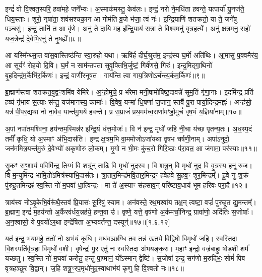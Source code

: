 इन्द्रं॑ वो वि॒श्वत॒स्परि॒ हवा॑महे॒ जने᳚भ्यः। अ॒स्माक॑मस्तु॒ केव॑लः। इन्द्रं॒ नरो॑ ने॒मधि॑ता हवन्ते॒ यत्पार्या॑ यु॒नज॑ते॒ धिय॒स्ताः। शूरो॒ नृषा॑ता॒ शव॑सश्चका॒न आ गोम॑ति व्र॒जे भ॑जा॒ त्वं नः॑। इ॒न्द्रि॒याणि॑ शतक्रतो॒ या ते॒ जने॑षु प॒ञ्चसु॑। इन्द्र॒ तानि॑ त॒ आ वृ॑णे। अनु॑ ते दायि म॒ह इ॑न्द्रि॒याय॑ स॒त्रा ते॒ विश्व॒मनु॑ वृत्र॒हत्ये᳚। अनु॑ क्ष॒त्रमनु॒ सहो॑ यज॒त्रेन्द्र॑ दे॒वेभि॒रनु॑ ते नृ॒षह्ये᳚॥८॥

आ यस्मि᳚न्थ्स॒प्त वा॑स॒वास्तिष्ठ॑न्ति स्वा॒रुहो॑ यथा। ऋषि॑र्\mbox{}ह दीर्घ॒श्रुत्त॑म॒ इन्द्र॑स्य घ॒र्मो अति॑थिः। आ॒मासु॑ प॒क्वमैर॑य॒ आ सूर्यꣳ॑ रोहयो दि॒वि। घ॒र्मं न साम॑न्तपता सुवृ॒क्तिभि॒र्जुष्टं॒ गिर्व॑णसे॒ गिरः॑। इन्द्र॒मिद्गा॒थिनो॑ बृ॒हदिन्द्र॑म॒र्केभि॑र॒र्किणः॑। इन्द्रं॒ वाणी॑रनूषत। गाय॑न्ति त्वा गाय॒त्रिणोऽर्च॑न्त्य॒र्कम॒र्किणः॑॥९॥

 ब्र॒ह्माण॑स्त्वा शतक्रत॒वुद्व॒ꣳ॒शमि॑व येमिरे। अ॒ꣳ॒हो॒मुचे॒ प्र भ॑रेमा मनी॒षामो॑षिष्ठ॒दावन्ने॑ सुम॒तिं गृ॑णा॒नाः। इ॒दमि॑न्द्र॒ प्रति॑ ह॒व्यं गृ॑भाय स॒त्याः स॑न्तु॒ यज॑मानस्य॒ कामाः᳚। वि॒वेष॒ यन्मा॑ धि॒षणा॑ ज॒जान॒ स्तवै॑ पु॒रा पार्या॒दिन्द्र॒मह्नः॑। अꣳह॑सो॒ यत्र॑ पी॒पर॒द्यथा॑ नो ना॒वेव॒ यान्त॑मु॒भये॑ हवन्ते। प्र स॒म्राजं॑ प्रथ॒मम॑ध्व॒राणा॑मꣳहो॒मुचं॑ वृष॒भं य॒ज्ञिया॑नाम्॥१०॥
 
अ॒पां नपा॑तमश्विना॒ हय॑न्तम॒स्मिन्न॑र इन्द्रि॒यं ध॑त्त॒मोजः॑। वि न॑ इन्द्र॒ मृधो॑ जहि नी॒चा य॑च्छ पृतन्य॒तः। अ॒ध॒स्प॒दं तमीं᳚ कृधि॒ यो अ॒स्माꣳ अ॑भि॒दास॑ति। इन्द्र॑ क्ष॒त्रम॒भि वा॒ममोजोऽजा॑यथा वृषभ चर्\mbox{}षणी॒नाम्। अपा॑ऽनुदो॒ जन॑ममित्र॒यन्त॑मु॒रुं दे॒वेभ्यो॑ अकृणोरु लो॒कम्। मृ॒गो न भी॒मः कु॑च॒रो गि॑रि॒ष्ठाः प॑रा॒वत॒ आ ज॑गामा॒ पर॑स्याः॥११॥
 
   सृ॒कꣳ स॒ꣳ॒शाय॑ प॒विमि॑न्द्र ति॒ग्मं वि शत्रू᳚न् ताढि॒ वि मृधो॑ नुदस्व। वि शत्रू॒न्॒ वि मृधो॑ नुद॒ वि वृ॒त्रस्य॒ हनू॑ रुज। वि म॒न्युमि॑न्द्र भामि॒तो॑ऽमित्र॑स्याभि॒दास॑तः। त्रा॒तार॒मिन्द्र॑मवि॒तार॒मिन्द्र॒ꣳ॒ हवे॑हवे सु॒हव॒ꣳ॒ शूर॒मिन्द्रम्᳚। हु॒वे नु श॒क्रं पु॑रुहू॒तमिन्द्रꣴ॑ स्व॒स्ति नो॑ म॒घवा॑ धा॒त्विन्द्रः॑। मा ते॑ अ॒स्याꣳ स॑हसाव॒न् परि॑ष्टाव॒धाय॑ भूम हरिवः परा॒दै॥१२॥ 
   
   त्राय॑स्व नोऽवृ॒केभि॒र्वरू॑थै॒स्तव॑ प्रि॒यासः॑ सू॒रिषु॑ स्याम। अन॑वस्ते॒ रथ॒मश्वा॑य तक्ष॒न् त्वष्टा॒ वज्रं॑ पुरुहूत द्यु॒मन्तम्᳚। ब्र॒ह्माण॒ इन्द्रं॑ म॒हय॑न्तो अ॒र्कैरव॑र्धय॒न्नह॑ये॒ हन्त॒वा उ॑। वृष्णे॒ यत्ते॒ वृष॑णो अ॒र्कमर्चा॒निन्द्र॒ ग्रावा॑णो॒ अदि॑तिः स॒जोषाः᳚। अ॒न॒श्वासो॒ ये प॒वयो॑ऽर॒था इन्द्रे॑षिता अ॒भ्यव॑र्तन्त॒ दस्यून्॑॥१७॥[१.६.१२]


यत॑ इन्द्र॒ भया॑महे॒ ततो॑ नो॒ अभ॑यं कृधि।
मघ॑वञ्छ॒ग्धि तव॒ तन्न॑ ऊ॒तये॒ विद्विषो॒ विमृधो॑ जहि।
स्व॒स्ति॒दा वि॒शस्पति॑र्वृत्र॒हा विमृधो॑ व॒शी।
वृषेन्द्रः॑ पु॒र एतु॑ नः स्वस्ति॒दा अ॑भयङ्क॒रः।
म॒हाꣳ इन्द्रो॒ वज्र॑बाहुः षोड॒शी शर्म॑ यच्छतु।
स्व॒स्ति नो॑ म॒घवा॑ करोतु॒ हन्तु॑ पा॒प्मानं॒ यो᳚ऽस्मान्‌ द्वेष्टि॑।
स॒जोषा॑ इन्द्र॒ सग॑णो म॒रुद्भिः॒ सोमं॑ पिब वृत्रहञ्छूर वि॒द्वान्‌।
ज॒हि शत्रू॒ꣳ॒रप॒मृधो॑नुद॒स्वाथाभ॑यं कृणु हि वि॒श्वतो॑ नः॥१८॥

